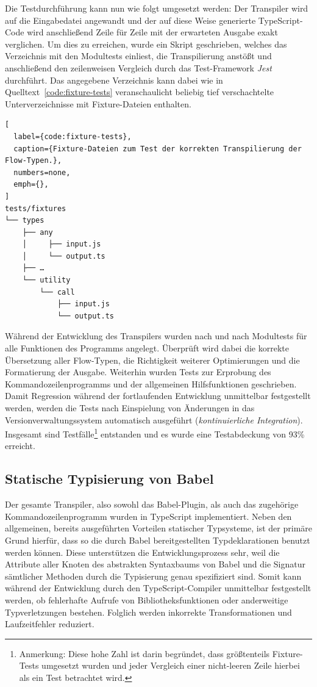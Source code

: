 Die Testdurchführung kann nun wie folgt umgesetzt werden: Der Transpiler wird auf die Eingabedatei angewandt und der auf diese Weise generierte TypeScript-Code wird anschließend Zeile für Zeile mit der erwarteten Ausgabe exakt verglichen. Um dies zu erreichen, wurde ein Skript geschrieben, welches das Verzeichnis mit den Modultests einliest, die Transpilierung anstößt und anschließend den zeilenweisen Vergleich durch das Test-Framework \textit{Jest}~\autocite{SOFTWARE:JEST} durchführt. Das angegebene Verzeichnis kann dabei wie in Quelltext~\ref{code:fixture-tests} veranschaulicht beliebig tief verschachtelte Unterverzeichnisse mit Fixture-Dateien enthalten.

\begin{lstlisting}[
  label={code:fixture-tests},
  caption={Fixture-Dateien zum Test der korrekten Transpilierung der Flow-Typen.},
  numbers=none,
  emph={},
]
tests/fixtures
└── types
    ├── any
    │     ├── input.js
    │     └── output.ts
    ├── …
    └── utility
        └── call
            ├── input.js
            └── output.ts
\end{lstlisting}

Während der Entwicklung des Transpilers wurden nach und nach Modultests für alle Funktionen des Programms angelegt. Überprüft wird dabei die korrekte Übersetzung aller Flow-Typen, die Richtigkeit weiterer Optimierungen und die Formatierung der Ausgabe. Weiterhin wurden Tests zur Erprobung des Kommandozeilenprogramms und der allgemeinen Hilfsfunktionen geschrieben. Damit Regression während der fortlaufenden Entwicklung unmittelbar festgestellt werden, werden die Tests nach Einspielung von Änderungen in das Versionverwaltungssystem automatisch ausgeführt (\textit{kontinuierliche Integration}). Insgesamt sind \numberOfTests Testfälle\footnote{Anmerkung: Diese hohe Zahl ist darin begründet, dass größtenteils Fixture-Tests umgesetzt wurden und jeder Vergleich einer nicht-leeren Zeile hierbei als ein Test betrachtet wird.} entstanden und es wurde eine Testabdeckung von 93\% erreicht.

\subsection{Statische Typisierung von Babel}

Der gesamte Transpiler, also sowohl das Babel-Plugin, als auch das zugehörige Kommandozeilenprogramm wurden in TypeScript implementiert. Neben den allgemeinen, bereits ausgeführten Vorteilen statischer Typsysteme, ist der primäre Grund hierfür, dass so die durch Babel bereitgestellten Typdeklarationen benutzt werden können. Diese unterstützen die Entwicklungsprozess sehr, weil die Attribute aller Knoten des abstrakten Syntaxbaums von Babel und die Signatur sämtlicher Methoden durch die Typisierung genau spezifiziert sind. Somit kann während der Entwicklung durch den TypeScript-Compiler unmittelbar festgestellt werden, ob fehlerhafte Aufrufe von Bibliotheksfunktionen oder anderweitige Typverletzungen bestehen. Folglich werden inkorrekte Transformationen und Laufzeitfehler reduziert.

